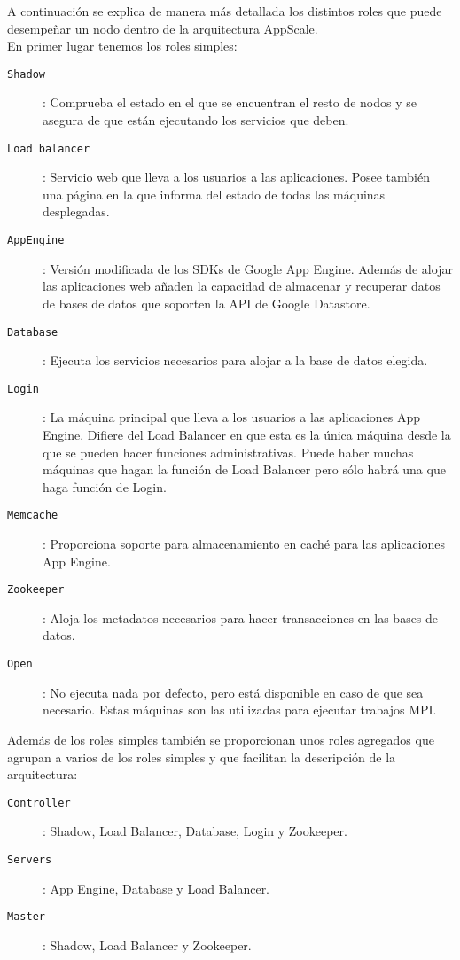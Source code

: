 A continuación se explica de manera más detallada los distintos roles que puede desempeñar un nodo dentro de la arquitectura AppScale. \\

En primer lugar tenemos los roles simples:

\begin{description}
\item[\texttt{Shadow}]: Comprueba el estado en el que se encuentran el resto de nodos y se asegura de que están ejecutando los servicios que deben.
\item[\texttt{Load balancer}]: Servicio web que lleva a los usuarios a las aplicaciones. Posee también una página en la que informa del estado de todas las máquinas desplegadas.
\item[\texttt{AppEngine}]: Versión modificada de los SDKs de Google App Engine. Además de alojar las aplicaciones web añaden la capacidad de almacenar y recuperar datos de bases de datos que soporten la API de Google Datastore.
\item[\texttt{Database}]: Ejecuta los servicios necesarios para alojar a la base de datos elegida.
\item[\texttt{Login}]: La máquina principal que lleva a los usuarios a las aplicaciones App Engine. Difiere del Load Balancer en que esta es la única máquina desde la que se pueden hacer funciones administrativas. Puede haber muchas máquinas que hagan la función de Load Balancer pero sólo habrá una que haga función de Login.
\item[\texttt{Memcache}]: Proporciona soporte para almacenamiento en caché para las aplicaciones App Engine.
\item[\texttt{Zookeeper}]: Aloja los metadatos necesarios para hacer transacciones en las bases de datos.
\item[\texttt{Open}]: No ejecuta nada por defecto, pero está disponible en caso de que sea necesario. Estas máquinas son las utilizadas para ejecutar trabajos MPI.
\end{description}

Además de los roles simples también se proporcionan unos roles agregados que agrupan a varios de los roles simples y que facilitan la descripción de la arquitectura:

\begin{description}
\item[\texttt{Controller}]: Shadow, Load Balancer, Database, Login y Zookeeper.
\item[\texttt{Servers}]: App Engine, Database y Load Balancer.
\item[\texttt{Master}]: Shadow, Load Balancer y Zookeeper.
\end{description}

